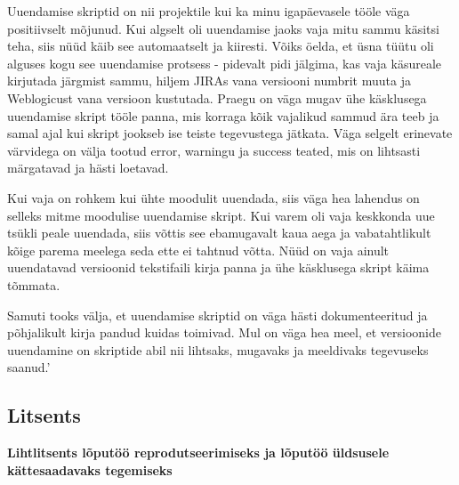 \documentclass[12pt]{report}
\begin{document}
  \begin{displayquote}
  Uuendamise skriptid on nii projektile kui ka minu igapäevasele tööle väga positiivselt mõjunud. 
Kui algselt oli uuendamise jaoks vaja mitu sammu käsitsi teha, siis nüüd käib see automaatselt ja kiiresti. Võiks öelda, et üsna tüütu oli alguses kogu see uuendamise protsess - pidevalt pidi jälgima, kas vaja käsureale kirjutada järgmist sammu, hiljem JIRAs vana versiooni numbrit muuta ja Weblogicust vana versioon kustutada. Praegu on väga mugav ühe käsklusega uuendamise skript tööle panna, mis korraga kõik vajalikud sammud ära teeb ja samal ajal kui skript jookseb ise teiste tegevustega jätkata. Väga selgelt erinevate värvidega on välja tootud error, warningu ja success teated, mis on lihtsasti märgatavad ja hästi loetavad.

Kui vaja on rohkem kui ühte moodulit uuendada, siis väga hea lahendus on selleks mitme moodulise uuendamise skript. Kui varem oli vaja keskkonda uue tsükli peale uuendada, siis võttis see ebamugavalt kaua aega ja vabatahtlikult kõige parema meelega seda ette ei tahtnud võtta. Nüüd on vaja ainult uuendatavad versioonid tekstifaili kirja panna ja ühe käsklusega skript käima tõmmata. 

Samuti tooks välja, et uuendamise skriptid on väga hästi dokumenteeritud ja põhjalikult kirja pandud kuidas toimivad. Mul on väga hea meel, et versioonide uuendamine on skriptide abil nii lihtsaks, mugavaks ja meeldivaks tegevuseks saanud.'
  \end{displayquote}

  \newpage

  \subsection*{Litsents}
  
  \textbf{Lihtlitsents lõputöö reprodutseerimiseks ja lõputöö üldsusele kättesaadavaks tegemiseks}\\
  
\end{document}
